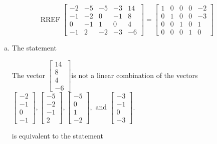 \begin{exerciseAnswer} 
\[\operatorname{RREF}  \left[\begin{array}{cccc|c}
-2 & -5 & -5 & -3 & 14 \\
-1 & -2 & 0 & -1 & 8 \\
0 & -1 & 1 & 0 & 4 \\
-1 & 2 & -2 & -3 & -6
\end{array}\right] = \left[\begin{array}{cccc|c}
1 & 0 & 0 & 0 & -2 \\
0 & 1 & 0 & 0 & -3 \\
0 & 0 & 1 & 0 & 1 \\
0 & 0 & 0 & 1 & 0
\end{array}\right] \]
\begin{enumerate}[(a)]
\item  The statement 
\begin{center}\begin{minipage}{0.8\textwidth}
 The vector \( \left[\begin{array}{c}
14 \\
8 \\
4 \\
-6
\end{array}\right] \)is not a linear combination of the vectors \( \left[\begin{array}{c}
-2 \\
-1 \\
0 \\
-1
\end{array}\right] , \left[\begin{array}{c}
-5 \\
-2 \\
-1 \\
2
\end{array}\right] , \left[\begin{array}{c}
-5 \\
0 \\
1 \\
-2
\end{array}\right] , \text{ and } \left[\begin{array}{c}
-3 \\
-1 \\
0 \\
-3
\end{array}\right] \). 
\end{minipage}\end{center}
     is equivalent to the statement 
\begin{center}\begin{minipage}{0.8\textwidth}

\end{minipage}
\end{center}
\end{enumerate}
\end{exerciseAnswer}
